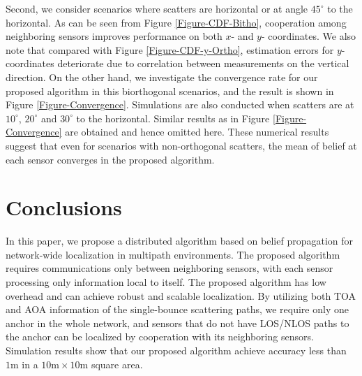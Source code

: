 \documentclass[10pt, twocolumn, final]{IEEEtran}
\begin{document}
Second, we consider scenarios where scatters are horizontal or at angle $45^{\circ}$ to the horizontal. As can be seen from Figure \ref{Figure-CDF-Bitho}, cooperation among neighboring sensors improves performance on both $x$- and $y$- coordinates. We also note that compared with Figure \ref{Figure-CDF-y-Ortho}, estimation errors for $y$-coordinates deteriorate due to correlation between measurements on the vertical direction. On the other hand, we investigate the convergence rate for our proposed algorithm in this biorthogonal scenarios, and the result is shown in Figure \ref{Figure-Convergence}. Simulations are also conducted when scatters are at $10^{\circ}$, $20^{\circ}$ and $30^{\circ}$ to the horizontal. Similar results as in Figure \ref{Figure-Convergence} are obtained and hence omitted here. These numerical results suggest that even for scenarios with non-orthogonal scatters, the mean of belief at each sensor converges in the proposed algorithm.

\section{Conclusions}\label{Section:Conclusions}
In this paper, we propose a distributed algorithm based on belief propagation for network-wide localization in multipath environments. The proposed algorithm requires communications only between neighboring sensors, with each sensor processing only information local to itself. The proposed algorithm has low overhead and can achieve robust and scalable localization. By utilizing both TOA and AOA information of the single-bounce scattering paths, we require only one anchor in the whole network, and sensors that do not have LOS/NLOS paths to the anchor can be localized by cooperation with its neighboring sensors. Simulation results show that our proposed algorithm achieve accuracy less than $1\mathrm{m}$ in a $10\mathrm{m} \times 10\mathrm{m}$ square area.



\end{document}
